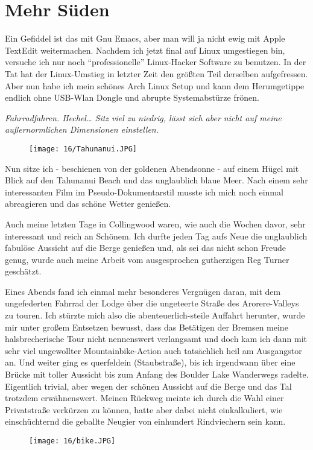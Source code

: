 \chapter{Mehr S\"uden}

Ein Gefiddel ist das mit Gnu Emacs, aber man will ja nicht ewig mit
Apple TextEdit weitermachen. Nachdem ich jetzt final auf Linux
umgestiegen bin, versuche ich nur noch ``professionelle'' Linux-Hacker
Software zu benutzen. In der Tat hat der Linux-Umstieg in letzter Zeit
den größten Teil derselben aufgefressen. Aber nun habe ich mein schönes
Arch Linux Setup und kann dem Herumgetippe endlich ohne USB-Wlan Dongle
und abrupte Systemabstürze frönen.

\emph{Fahrradfahren. Hechel\ldots{} Sitz viel zu niedrig, lässt sich aber
nicht auf meine außernormlichen Dimensionen einstellen.}

\begin{figure}[h]
  \centering
  \texttt{[image: 16/Tahunanui.JPG]}
\end{figure}
Nun sitze ich - beschienen von der goldenen Abendsonne - auf einem Hügel
mit Blick auf den Tahunanui Beach und das unglaublich blaue Meer. Nach
einem sehr interessanten Film im Pseudo-Dokumentarstil musste ich mich
noch einmal abreagieren und das schöne Wetter genießen.

Auch meine letzten Tage in Collingwood waren, wie auch die Wochen davor,
sehr interessant und reich an Schönem. Ich durfte jeden Tag aufs Neue
die unglaublich fabulöse Aussicht auf die Berge genießen und, als sei
das nicht schon Freude genug, wurde auch meine Arbeit vom ausgesprochen
gutherzigen Reg Turner geschätzt.

Eines Abends fand ich einmal mehr besonderes Vergnügen daran, mit dem
ungefederten Fahrrad der Lodge über die ungeteerte Straße des
Arorere-Valleys zu touren. Ich stürzte mich also die
abenteuerlich-steile Auffahrt herunter, wurde mir unter großem Entsetzen
bewusst, dass das Betätigen der Bremsen meine halsbrecherische Tour
nicht nennenswert verlangsamt und doch kam ich dann mit sehr viel
ungewollter Mountainbike-Action auch tatsächlich heil am Ausgangstor an.
Und weiter ging es querfeldein (Staubstraße), bis ich irgendwann über
eine Brücke mit toller Aussicht bis zum Anfang des Boulder Lake
Wanderwegs radelte. Eigentlich trivial, aber wegen der schönen Aussicht
auf die Berge und das Tal trotzdem erwähnenswert. Meinen Rückweg meinte
ich durch die Wahl einer Privatstraße verkürzen zu können, hatte aber
dabei nicht einkalkuliert, wie einschüchternd die geballte Neugier von
einhundert Rindviechern sein kann.
\begin{figure}[h]
  \centering
  \texttt{[image: 16/bike.JPG]}
\end{figure}

